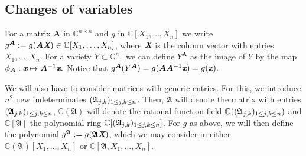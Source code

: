 \documentclass[a4paper]{article}
\def\A{\mathfrak{A}}
\def\Xb{\textit{\textbf{X}}}
\def\mA{{\bm A}}
\def\xb{\textit{\textbf{x}}}
\def\fb{\textit{\textbf{f}}}
\def\minors{\textrm{Minors}(F,p)}
\def\pa{\partial}
\def\C{\mathbb{C}}
\def\Wi{W(\pi_i,V)}
\def\Ii{\mathfrak{I}(i,F)}
\def\td{{\bf todo}}
\begin{document}
%
%
%
%
%
\subsection{Changes of variables}
For a matrix $\mA$ in $\C^{n\times n}$ and $g$ in
$\C[X_1,\hdots,X_n]$ we write $g^\mA:=g(\mA \Xb) \in
\C[X_1,\dots,X_n]$, where $\Xb$ is the column vector with entries
$X_1,\dots,X_n$. For a variety $Y \subset \C^n,$ we can define $Y^{\mA}$ as the image of $Y$ by the map $\phi_{\mA} : \xb \mapsto \mA^{-1}\xb.$ Notice that $g^{\mA}(Y^{\mA}) = g(\mA \mA^{-1}\xb)=g(\xb).$ 

We will also have to consider matrices with generic entries. For this,
we introduce $n^2$ new indeterminates $(\frak A_{j,k})_{1\le j,k \le
  n}$. Then, $\A$ will denote the matrix with entries $(\frak
A_{j,k})_{1\le j,k \le n}$, $\C(\A)$ will denote the rational function
field $\C((\frak A_{j,k})_{1\le j,k \le n})$ and $\C[\A]$ the
polynomial ring $\C[(\frak A_{j,k})_{1\le j,k \le n}]$.  For $g$ as
above, we will then define the polynomial $g^\A:=g(\A \Xb)$, 
which we may consider in either
$\C(\A)[X_1,\dots,X_n]$ or $\C[\A,X_1,\dots,X_n]$.
\end{document}
